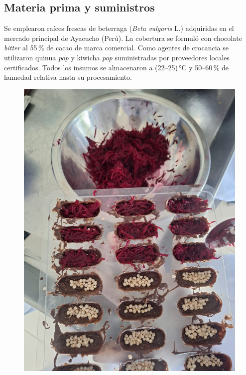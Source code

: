 \documentclass[manuscript,screen,review]{acmart}
\begin{document}
    \subsection{Materia prima y suministros}
    Se emplearon raíces frescas de beterraga (\textit{Beta vulgaris} L.) adquiridas en el mercado principal de Ayacucho (Perú).  
    La cobertura se formuló con chocolate \emph{bitter} al 55\,\% de cacao de marca comercial.  
    Como agentes de crocancia se utilizaron quinua \emph{pop} y kiwicha \emph{pop} suministradas por proveedores locales certificados.  
    Todos los insumos se almacenaron a (22–25)\,°C y 50–60\,\% de humedad relativa hasta su procesamiento.
        \begin{figure}[H]
          \centering
          \begin{minipage}{0.48\linewidth}
            \centering
            \includegraphics[width=0.9\linewidth]{imagen/beterraga-quinua.jpeg}
            

\end{minipage}
\end{figure}
\end{document}
